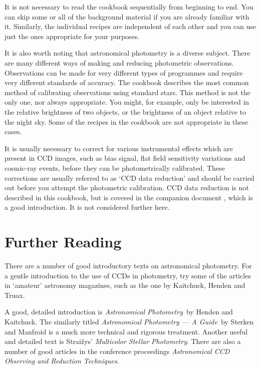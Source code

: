 \documentclass[twoside,11pt,nolof]{starlink}
\begin{document}
It is not necessary to read the cookbook sequentially from beginning
to end.  You can skip some or all of the background material if you
are already familiar with it.  Similarly, the individual recipes are
independent of each other and you can use just the ones appropriate for
your purposes.

It is also worth noting that astronomical photometry is a diverse
subject.  There are many different ways of making and reducing
photometric observations.  Observations can be made for very different
types of programmes and require very different standards of accuracy.
The cookbook describes the most common method of calibrating observations
using standard stars.  This method is not the only one, nor always
appropriate.  You might, for example, only be interested in the
relative brightness of two objects, or the brightness of an object
relative to the night sky.  Some of the recipes in the cookbook are not
appropriate in these cases.

It is usually necessary to correct for various instrumental effects
which are present in CCD images, such as bias signal, flat field sensitivity
variations and cosmic-ray events, before they can be photometrically
calibrated.  These corrections are usually referred to as `CCD data
reduction' and should be carried out before you attempt the photometric
calibration.  CCD data reduction is not described in this cookbook, but is
covered in the companion document \/\cite{SC5}, which is a good introduction.
It is not considered further here.


\section{\label{FUREAD}Further Reading}

There are a number of good introductory texts on astronomical
photometry.  For a gentle introduction to the use of CCDs in photometry,
try some of the articles in `amateur' astronomy magazines, such as the
one by Kaitchuck, Henden and Truax\cite{KAITCHUCK94}.

A good, detailed introduction is \textit{Astronomical Photometry}\, by Henden
and Kaitchuck\cite{HENDEN90}.  The similarly titled \textit{Astronomical
Photometry --- A Guide}\, by Sterken and Manfroid\cite{STERKEN92} is a
much more technical and rigorous treatment.  Another useful and detailed
text is Strai\v{z}ys' \textit{Multicolor Stellar Photometry}\/\cite{STRAIZYS92}.
There are also a number of good articles in the conference proceedings \textit{Astronomical CCD Observing and Reduction Techniques}\/\cite{HOWELL92}.
\end{document}

